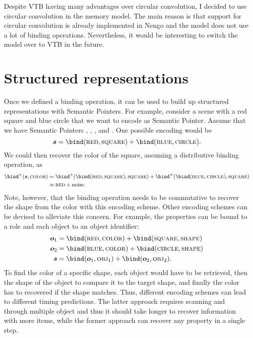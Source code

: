 Despite VTB having many advantages over circular convolution, I decided to use circular convolution in the memory model.
The main reason is that support for circular convolution is already implemented in Nengo and the model does not use a lot of binding operations.
Nevertheless, it would be interesting to switch the model over to VTB in the future.


\section{Structured representations}
Once we defined a binding operation, it can be used to build up structured representations with Semantic Pointers.
For example, consider a scene with a red square and blue circle that we want to encode as Semantic Pointer.
Assume that we have Semantic Pointers , , , and .
One possible encoding would be
\begin{equation}
    \vc s = \bind(\spc{red}, \spc{square}) + \bind(\spc{blue}, \spc{circle}) \text{.}
\end{equation}
We could then recover the color of the square, assuming a distributive binding operation, as
\begin{align}
    \bind^+(\vc s, \spc{color}) &= \bind^+(\bind(\spc{red}, \spc{square}), \spc{square}) + \bind^+(\bind(\spc{blue}, \spc{circle}), \spc{square}) \\
    &\approx \spc{red} + \mathrm{noise} \text{.}
\end{align}
Note, however, that the binding operation needs to be commutative to recover the shape from the color with this encoding scheme.
Other encoding schemes can be devised to alleviate this concern.
For example, the properties can be bound to a role and each object to an object identifier:
\begin{align}
    \vc o_1 &= \bind(\spc{red}, \spc{color}) + \bind(\spc{square}, \spc{shape}) \\
    \vc o_2 &= \bind(\spc{blue}, \spc{color}) + \bind(\spc{circle}, \spc{shape}) \\
    \vc s &= \bind(\vc o_1, \spc{obj}_1) + \bind(\vc o_2, \spc{obj}_2) \text{.}
\end{align}
To find the color of a specific shape, each object would have to be retrieved, then the shape of the object to compare it to the target shape, and finally the color has to recovered if the shape matches.
Thus, different encoding schemes can lead to different timing predictions.
The latter approach requires scanning and through multiple object and thus it should take longer to recover information with more items, while the former approach can recover any property in a single step.
